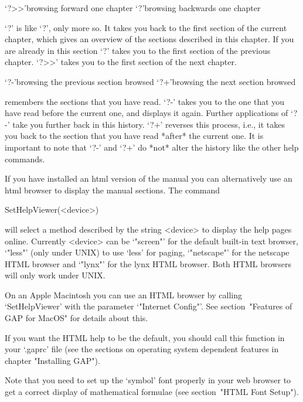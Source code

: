 \>`?>>'{browsing forward one chapter}
\>`?\<\<'{browsing backwards one chapter}

`?\<\<' is like `?\<', only more so. It takes you back to the first
section of the current chapter, which gives an overview of the sections
described in this chapter. If you are already in this section `?\<\<'
takes you to the first section of the previous chapter. `?>>' takes you
to the first section of the next chapter.

\>`?-'{browsing the previous section browsed}
\>`?+'{browsing the next section browsed}

{\GAP} remembers the sections that you have read. `?-' takes you to the
one that you have read before the current one, and displays it again.
Further applications of `?-' take you further back in this history. `?+' reverses this
process, i.e., it takes you back to the section that you have read
*after* the current one. It is important to note that `?-' and `?+' do
*not* alter the history like the other help commands.




If you have installed an html version of the manual you can
alternatively use an html browser to display the manual sections. The
command

\>SetHelpViewer(<device>)

will select a method described by the string <device> to display the help
pages online. Currently <device> can be `"screen"' for the default built-in
text browser, `"less"' (only under UNIX) to use `less' for paging,
`"netscape"' for the netscape HTML browser and `"lynx"' for the
lynx HTML browser. Both HTML browsers will only work under UNIX. 

On an Apple Macintosh you can use an HTML browser by calling `SetHelpViewer'
with the parameter `"Internet Config"'.
See section~"Features of GAP for MacOS" for details about this.

If you want the HTML help to be the default, you should call this function
in your `.gaprc' file (see the sections on operating
system dependent features in chapter "Installing GAP").

Note that you need to set up the `symbol' font properly in your web browser
to get a correct display of mathematical formulae (see section~"HTML Font
Setup").

